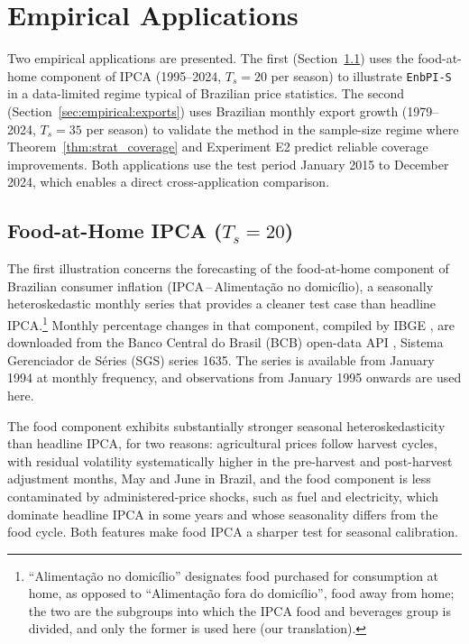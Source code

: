 \section{Empirical Applications}
\label{sec:empirical}

Two empirical applications are presented.  The first
(Section~\ref{sec:empirical:food}) uses the food-at-home component of
IPCA (1995--2024, $T_s = 20$ per season) to illustrate
\texttt{EnbPI-S} in a data-limited regime typical of Brazilian price
statistics.  The second (Section~\ref{sec:empirical:exports}) uses
Brazilian monthly export growth (1979--2024, $T_s = 35$ per season)
to validate the method in the sample-size regime where
Theorem~\ref{thm:strat_coverage} and Experiment E2 predict reliable
coverage improvements.  Both applications use the test period
January 2015 to December 2024, which enables a direct
cross-application comparison.

\subsection{Food-at-Home IPCA (\texorpdfstring{$T_s = 20$}{Ts = 20})}
\label{sec:empirical:food}

The first illustration concerns the forecasting of the food-at-home
component of Brazilian consumer inflation
(IPCA\,--\,Alimentação no domicílio), a seasonally heteroskedastic
monthly series that provides a cleaner test case than headline
IPCA.\footnote{``Alimentação no domicílio'' designates food
purchased for consumption at home, as opposed to ``Alimentação fora
do domicílio'', food away from home; the two are the subgroups into
which the IPCA food and beverages group is divided, and only the
former is used here (our translation).}
Monthly percentage changes in that component, compiled by IBGE
\citep{ibge2024ipca}, are downloaded from the Banco Central do Brasil
(BCB) open-data API \citep{bcb2024sgs}, Sistema Gerenciador de
S\'eries (SGS) series 1635.  The series is available from January
1994 at monthly frequency, and observations from January 1995 onwards
are used here.

The food component exhibits substantially stronger seasonal
heteroskedasticity than headline IPCA, for two reasons: agricultural
prices follow harvest cycles, with residual volatility systematically
higher in the pre-harvest and post-harvest adjustment months, May and
June in Brazil, and the food component is less contaminated by
administered-price shocks, such as fuel and electricity, which
dominate headline IPCA in some years and whose seasonality differs
from the food cycle.  Both features make food IPCA a sharper test for
seasonal calibration.

